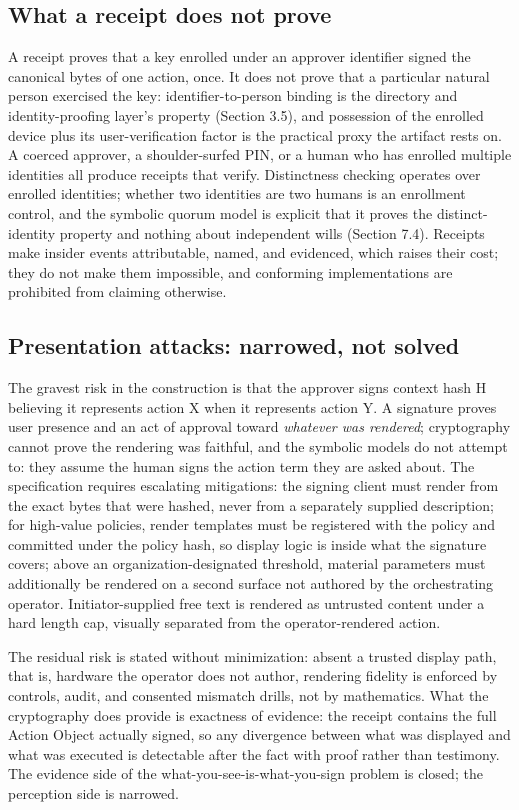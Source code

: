 \documentclass[11pt]{article}
\begin{document}
\subsection{What a receipt does not prove}

A receipt proves that a key enrolled under an approver identifier signed the
canonical bytes of one action, once. It does not prove that a particular natural
person exercised the key: identifier-to-person binding is the directory and
identity-proofing layer's property (Section 3.5), and possession of the enrolled
device plus its user-verification factor is the practical proxy the artifact rests
on. A coerced approver, a shoulder-surfed PIN, or a human who has enrolled multiple
identities all produce receipts that verify. Distinctness checking operates over
enrolled identities; whether two identities are two humans is an enrollment control,
and the symbolic quorum model is explicit that it proves the distinct-identity
property and nothing about independent wills (Section 7.4). Receipts make insider
events attributable, named, and evidenced, which raises their cost; they do not make
them impossible, and conforming implementations are prohibited from claiming
otherwise.

\subsection{Presentation attacks: narrowed, not solved}

The gravest risk in the construction is that the approver signs context hash H
believing it represents action X when it represents action Y. A signature proves
user presence and an act of approval toward \emph{whatever was rendered};
cryptography cannot prove the rendering was faithful, and the symbolic models do not
attempt to: they assume the human signs the action term they are asked about. The
specification requires escalating mitigations: the signing client must render from
the exact bytes that were hashed, never from a separately supplied description; for
high-value policies, render templates must be registered with the policy and
committed under the policy hash, so display logic is inside what the signature
covers; above an organization-designated threshold, material parameters must
additionally be rendered on a second surface not authored by the orchestrating
operator. Initiator-supplied free text is rendered as untrusted content under a hard
length cap, visually separated from the operator-rendered action.

The residual risk is stated without minimization: absent a trusted display path,
that is, hardware the operator does not author, rendering fidelity is enforced by
controls, audit, and consented mismatch drills, not by mathematics. What the
cryptography does provide is exactness of evidence: the receipt contains the full
Action Object actually signed, so any divergence between what was displayed and what
was executed is detectable after the fact with proof rather than testimony. The
evidence side of the what-you-see-is-what-you-sign problem is closed; the perception
side is narrowed.
\end{document}
